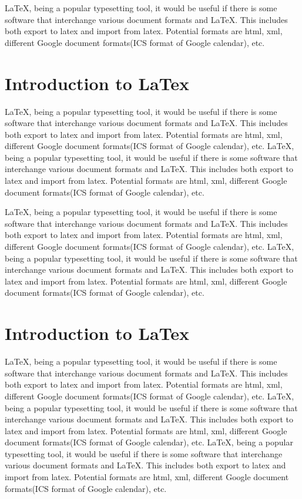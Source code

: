 \documentclass[a4paper,10pt]{mesreport}
\begin{document}
LaTeX, being a popular typesetting tool, it would be useful if there is some software that interchange
various document formats and LaTeX. This includes both export to latex and import from latex.
Potential formats are html, xml, different Google document formats(ICS format of Google calendar), etc.

\section{Introduction to LaTex}
LaTeX, being a popular typesetting tool, it would be useful if there is some software that interchange
various document formats and LaTeX. This includes both export to latex and import from latex.
Potential formats are html, xml, different Google document formats(ICS format of Google calendar), etc.
LaTeX, being a popular typesetting tool, it would be useful if there is some software that interchange
various document formats and LaTeX. This includes both export to latex and import from latex.
Potential formats are html, xml, different Google document formats(ICS format of Google calendar), etc.

LaTeX, being a popular typesetting tool, it would be useful if there is some software that interchange
various document formats and LaTeX. This includes both export to latex and import from latex.
Potential formats are html, xml, different Google document formats(ICS format of Google calendar), etc.
LaTeX, being a popular typesetting tool, it would be useful if there is some software that interchange
various document formats and LaTeX. This includes both export to latex and import from latex.
Potential formats are html, xml, different Google document formats(ICS format of Google calendar), etc.

\section{Introduction to LaTex}
LaTeX, being a popular typesetting tool, it would be useful if there is some software that interchange
various document formats and LaTeX. This includes both export to latex and import from latex.
Potential formats are html, xml, different Google document formats(ICS format of Google calendar), etc.
LaTeX, being a popular typesetting tool, it would be useful if there is some software that interchange
various document formats and LaTeX. This includes both export to latex and import from latex.
Potential formats are html, xml, different Google document formats(ICS format of Google calendar), etc.
LaTeX, being a popular typesetting tool, it would be useful if there is some software that interchange
various document formats and LaTeX. This includes both export to latex and import from latex.
Potential formats are html, xml, different Google document formats(ICS format of Google calendar), etc.
\end{document}
